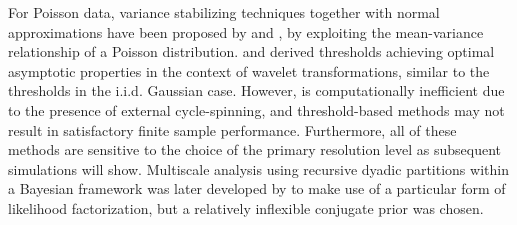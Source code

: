 \documentclass[12pt]{article}
\begin{document}
For Poisson data, variance stabilizing techniques together with normal approximations have been proposed by \cite{D93} and \cite{Fryzlewicz2004HaarFisz}, by exploiting the mean-variance relationship of a Poisson distribution. \cite{Kolaczyk1996NonParametric} and \cite{kolaczyk1999wavelet} derived thresholds achieving optimal asymptotic properties in the context of wavelet transformations, similar to the thresholds in the i.i.d. Gaussian case.  However, \cite{Fryzlewicz2004HaarFisz} is computationally inefficient due to the presence of external cycle-spinning, and threshold-based methods may not result in satisfactory finite sample performance. Furthermore, all of these methods are sensitive to the choice of the primary resolution level as subsequent simulations will show. Multiscale analysis using recursive dyadic partitions within a Bayesian framework was later developed by \cite{Kolaczyk1999Bayesian} to make use of a particular form of likelihood factorization, but a relatively inflexible conjugate prior was chosen. 



\end{document}
